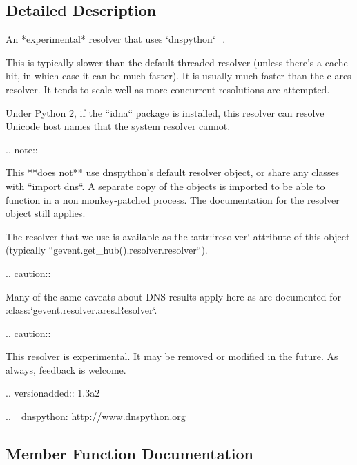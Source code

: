 \subsection{Detailed Description}
\begin{DoxyVerb}An *experimental* resolver that uses `dnspython`_.

This is typically slower than the default threaded resolver
(unless there's a cache hit, in which case it can be much faster).
It is usually much faster than the c-ares resolver. It tends to
scale well as more concurrent resolutions are attempted.

Under Python 2, if the ``idna`` package is installed, this
resolver can resolve Unicode host names that the system resolver
cannot.

.. note::

    This **does not** use dnspython's default resolver object, or share any
    classes with ``import dns``. A separate copy of the objects is imported to
    be able to function in a non monkey-patched process. The documentation for the resolver
    object still applies.

    The resolver that we use is available as the :attr:`resolver` attribute
    of this object (typically ``gevent.get_hub().resolver.resolver``).

.. caution::

    Many of the same caveats about DNS results apply here as are documented
    for :class:`gevent.resolver.ares.Resolver`.

.. caution::

    This resolver is experimental. It may be removed or modified in
    the future. As always, feedback is welcome.

.. versionadded:: 1.3a2

.. _dnspython: http://www.dnspython.org
\end{DoxyVerb}
 

\subsection{Member Function Documentation}
\mbox{\label{classgevent_1_1resolver_1_1dnspython_1_1_resolver_a2d9f5e7cece604fbc7df0261444c0e72}} 
